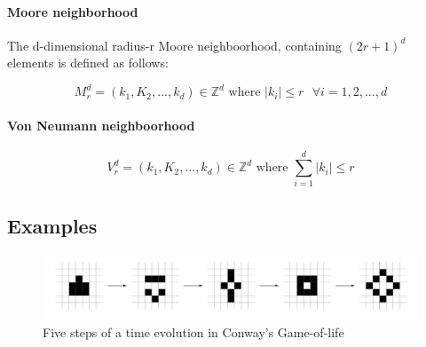 \paragraph{Moore neighborhood}

The d-dimensional radius-r Moore neighboorhood, containing $(2r +1)^d$ elements is defined as follows:

$$M_r^d = (k_1, K_2,...,k_d) \in \mathds{Z}^d \text{ where } |k_i| \leq r \text{  } \forall i = 1,2,...,d $$ 

\paragraph{Von Neumann neighboorhood}


$$V_r^d = (k_1, K_2,...,k_d) \in \mathds{Z}^d \text{ where } \sum_{i=1}^{d} |k_i| \leq r$$



\subsection{Examples}

\begin{figure}
  \centering
    \includegraphics[width=1\textwidth]{gameoflife_example}%
    
  \caption{Five steps of a time evolution in Conway's Game-of-life\cite{canotes}}
  \label{fig:gameoflife}
\end{figure}



